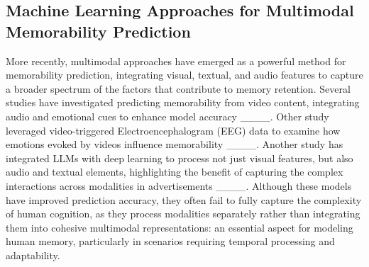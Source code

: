 \subsection{Machine Learning Approaches for Multimodal Memorability Prediction}
More recently, multimodal approaches have emerged as a powerful method for memorability prediction, integrating visual, textual, and audio features to capture a broader spectrum of the factors that contribute to memory retention. Several studies have investigated predicting memorability from video content, integrating audio and emotional cues to enhance model accuracy ____. Other study leveraged video-triggered Electroencephalogram (EEG) data to examine how emotions evoked by videos influence memorability ____. Another study has integrated LLMs with deep learning to process not just visual features, but also audio and textual elements, highlighting the benefit of capturing the complex interactions across modalities in advertisements ____. Although these models have improved prediction accuracy, they often fail to fully capture the complexity of human cognition, as they process modalities separately rather than integrating them into cohesive multimodal representations: an essential aspect for modeling human memory, particularly in scenarios requiring temporal processing and adaptability.